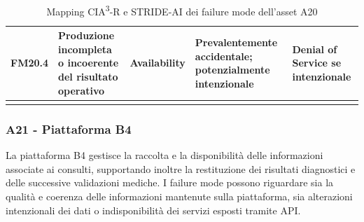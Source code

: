 {\begin{xltabular}{\textwidth}{
    >{\raggedright\arraybackslash}p{1.35cm}
    X
    >{\raggedright\arraybackslash}p{3.5cm}
    >{\raggedright\arraybackslash}p{2.7cm}
    >{\raggedright\arraybackslash}p{2.4cm}
}
\midrule


FM20.4 &

Produzione incompleta o incoerente del risultato operativo &

Availability &

Prevalentemente accidentale; potenzialmente intenzionale &

Denial of Service se intenzionale \\

\bottomrule

\caption{Mapping CIA\textsuperscript{3}-R e STRIDE-AI dei failure mode dell'asset A20}

\label{tab:a20-stride}\\

\end{xltabular}
}

\subsubsection{A21 - Piattaforma B4}
La piattaforma B4 gestisce la raccolta e la disponibilità delle informazioni associate ai consulti, supportando inoltre la restituzione dei risultati diagnostici e delle successive validazioni mediche. I failure mode possono riguardare sia la qualità e coerenza delle informazioni mantenute sulla piattaforma, sia alterazioni intenzionali dei dati o indisponibilità dei servizi esposti tramite API.








